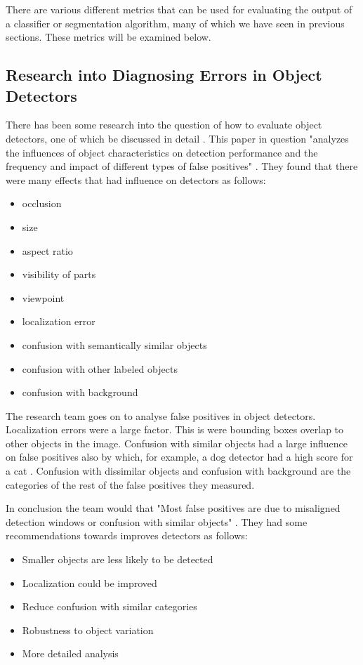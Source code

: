 There are various different metrics that can be used for evaluating the output
of a classifier or segmentation algorithm, many of which we have seen in previous
sections. These metrics will be examined below.

\subsection*{Research into Diagnosing Errors in Object Detectors}
There has been some research into the question of how to evaluate object
detectors, one of which be discussed in detail \textcite{diagnosingErrors}.
This paper in question "analyzes the influences of object characteristics on
detection performance and the frequency and impact of different types of false
positives" \textcite{diagnosingErrors}. They found that there were many effects
that had influence on detectors as follows:
\begin{itemize}
    \item{occlusion}
    \item{size}
    \item{aspect ratio}
    \item{visibility of parts}
    \item{viewpoint}
    \item{localization error}
    \item{confusion with semantically similar objects}
    \item{confusion with other labeled objects}
    \item{confusion with background}
\end{itemize}

The research team goes on to analyse false positives in object detectors.
Localization errors were a large factor. This is were bounding boxes overlap to
other objects in the image. Confusion with similar objects had a large influence
on false positives also by which, for example, a dog detector had a high score
for a cat \textcite{diagnosingErrors}. Confusion with dissimilar objects and
confusion with background are the categories of the rest of the false positives
they measured.

In conclusion the team would that "Most false positives are due to misaligned
detection windows or confusion with similar objects"
\textcite{diagnosingErrors}. They had some recommendations towards improves
detectors as follows:
\begin{itemize}
	\item{Smaller objects are less likely to be detected}
	\item{Localization could be improved}
	\item{Reduce confusion with similar categories}
	\item{Robustness to object variation}
	\item{More detailed analysis}
\end{itemize}

